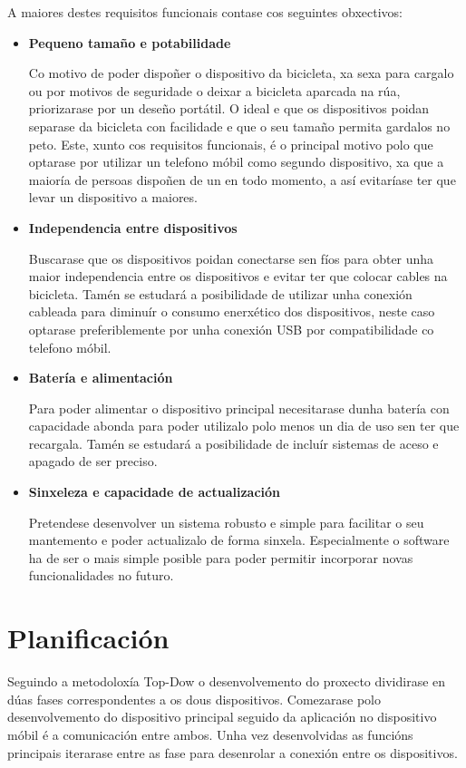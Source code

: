 A maiores destes requisitos funcionais contase cos seguintes obxectivos:
\begin{itemize}
    \item \textbf{Pequeno tamaño e potabilidade}

Co motivo de poder dispoñer o dispositivo da bicicleta, xa sexa para cargalo ou por motivos de seguridade o deixar a bicicleta aparcada na rúa, priorizarase por un deseño portátil. O ideal e que os dispositivos poidan separase da bicicleta con facilidade e que o seu tamaño permita gardalos no peto. Este, xunto cos requisitos funcionais, é o principal motivo polo que optarase por utilizar un telefono móbil como segundo dispositivo, xa que a maioría de persoas dispoñen de un en todo momento, a así evitaríase ter que levar un dispositivo a maiores.

    \item \textbf{Independencia entre dispositivos}

Buscarase que os dispositivos poidan conectarse sen fíos para obter unha maior independencia entre os dispositivos e evitar ter que colocar cables na bicicleta. Tamén se estudará a posibilidade de utilizar unha conexión cableada para diminuír o consumo enerxético dos dispositivos, neste caso optarase preferiblemente por unha conexión USB por compatibilidade co telefono móbil.

    \item \textbf{Batería e alimentación}

Para poder alimentar o dispositivo principal necesitarase dunha batería con capacidade abonda para poder utilizalo polo menos un dia de uso sen ter que recargala. Tamén se estudará a posibilidade de incluír sistemas de aceso e apagado de ser preciso.

    \item \textbf{Sinxeleza e capacidade de actualización}

Pretendese desenvolver un sistema robusto e simple para facilitar o seu mantemento e poder actualizalo de forma sinxela. Especialmente o software ha de ser o mais simple posible para poder permitir incorporar novas funcionalidades no futuro.
\end{itemize}
\section{Planificación}

Seguindo a metodoloxía Top-Dow o desenvolvemento do proxecto dividirase en dúas fases correspondentes a os dous dispositivos. Comezarase polo desenvolvemento do dispositivo principal seguido da aplicación no dispositivo móbil é a comunicación entre ambos. Unha vez desenvolvidas as funcións principais iterarase entre as fase para desenrolar a conexión entre os dispositivos.

